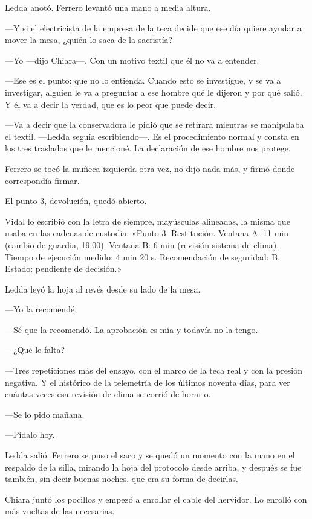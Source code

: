 Ledda anotó. Ferrero levantó una mano a media altura.

---Y si el electricista de la empresa de la teca decide que ese día quiere ayudar a mover la mesa, ¿quién lo saca de la sacristía?

---Yo ---dijo Chiara---. Con un motivo textil que él no va a entender.

---Ese es el punto: que no lo entienda. Cuando esto se investigue, y se va a investigar, alguien le va a preguntar a ese hombre qué le dijeron y por qué salió. Y él va a decir la verdad, que es lo peor que puede decir.

---Va a decir que la conservadora le pidió que se retirara mientras se manipulaba el textil. ---Ledda seguía escribiendo---. Es el procedimiento normal y consta en los tres traslados que le mencioné. La declaración de ese hombre nos protege.

Ferrero se tocó la muñeca izquierda otra vez, no dijo nada más, y firmó donde correspondía firmar.

El punto 3, devolución, quedó abierto.

Vidal lo escribió con la letra de siempre, mayúsculas alineadas, la misma que usaba en las cadenas de custodia: «Punto 3. Restitución. Ventana A: 11 min (cambio de guardia, 19:00). Ventana B: 6 min (revisión sistema de clima). Tiempo de ejecución medido: 4 min 20 s. Recomendación de seguridad: B. Estado: pendiente de decisión.»

Ledda leyó la hoja al revés desde su lado de la mesa.

---Yo la recomendé.

---Sé que la recomendó. La aprobación es mía y todavía no la tengo.

---¿Qué le falta?

---Tres repeticiones más del ensayo, con el marco de la teca real y con la presión negativa. Y el histórico de la telemetría de los últimos noventa días, para ver cuántas veces esa revisión de clima se corrió de horario.

---Se lo pido mañana.

---Pídalo hoy.

Ledda salió. Ferrero se puso el saco y se quedó un momento con la mano en el respaldo de la silla, mirando la hoja del protocolo desde arriba, y después se fue también, sin decir buenas noches, que era su forma de decirlas.

Chiara juntó los pocillos y empezó a enrollar el cable del hervidor. Lo enrolló con más vueltas de las necesarias.

